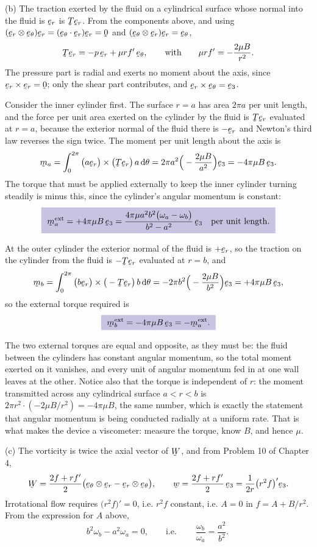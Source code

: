 \begin{solution}
(b) The traction exerted by the fluid on a cylindrical surface
whose normal into the fluid is $\ber$ is $\bT\ber$. From the components
above, and using $(\ber\otimes\bet)\ber=(\ip{\bet}{\ber})\ber=\bze$ and
$(\bet\otimes\ber)\ber=\bet$,
\[
   \bT\ber=-p\,\ber+\mu rf'\,\bet,
   \qquad\text{with}\qquad
   \mu rf'=-\frac{2\mu B}{r^{2}} .
\]
The pressure part is radial and exerts no moment about the axis, since
$\ber\times\ber=\bze$; only the shear part contributes, and
$\ber\times\bet=\be_{3}$.

Consider the inner cylinder first. The surface $r=a$ has area $2\pi a$
per unit length, and the force per unit area exerted on the cylinder by
the fluid is $\bT\ber$ evaluated at $r=a$, because the exterior normal
of the fluid there is $-\ber$ and Newton's third law reverses the sign
twice. The moment per unit length about the axis is
\[
   \bmm_{a}=\int_{0}^{2\pi}\big(a\ber\big)\times
   \big(\bT\ber\big)\,a\,\dl\theta
   =2\pi a^{2}\Big(-\frac{2\mu B}{a^{2}}\Big)\be_{3}
   =-4\pi\mu B\,\be_{3}.
\]
The torque that must be applied externally to keep the inner cylinder
turning steadily is minus this, since the cylinder's angular momentum is
constant:
\[
   \boxed{\ \bmm^{\text{ext}}_{a}=+4\pi\mu B\,\be_{3}
   =\frac{4\pi\mu a^{2}b^{2}\big(\omega_{a}-\omega_{b}\big)}
          {b^{2}-a^{2}}\,\be_{3}\quad\text{per unit length}. \ }
\]

At the outer cylinder the exterior normal of the fluid is $+\ber$, so
the traction on the cylinder from the fluid is $-\bT\ber$ evaluated at
$r=b$, and
\[
   \bmm_{b}=\int_{0}^{2\pi}\big(b\ber\big)\times
   \big(-\bT\ber\big)\,b\,\dl\theta
   =-2\pi b^{2}\Big(-\frac{2\mu B}{b^{2}}\Big)\be_{3}
   =+4\pi\mu B\,\be_{3},
\]
so the external torque required is
\[
   \boxed{\ \bmm^{\text{ext}}_{b}=-4\pi\mu B\,\be_{3}
   =-\bmm^{\text{ext}}_{a}. \ }
\]

The two external torques are equal and opposite, as they must be: the
fluid between the cylinders has constant angular momentum, so the total
moment exerted on it vanishes, and every unit of angular momentum fed in
at one wall leaves at the other. Notice also that the torque is
independent of $r$: the moment transmitted across any cylindrical
surface $a<r<b$ is $2\pi r^{2}\cdot(-2\mu B/r^{2})=-4\pi\mu B$, the same
number, which is exactly the statement that angular momentum is being
conducted radially at a uniform rate. That is what makes the device a
viscometer: measure the torque, know $B$, and hence $\mu$.

(c) The vorticity is twice the axial vector of $\bW$, and from
Problem 10 of Chapter 4,
\[
   \bW=\frac{2f+rf'}{2}\big(\bet\otimes\ber-\ber\otimes\bet\big),
   \qquad
   \bw=\frac{2f+rf'}{2}\,\be_{3}=\frac{1}{2r}\big(r^{2}f\big)'\be_{3}.
\]
Irrotational flow requires $\big(r^{2}f\big)'=0$, i.e. $r^{2}f$
constant, i.e. $A=0$ in $f=A+B/r^{2}$. From the expression for $A$ above,
\[
   b^{2}\omega_{b}-a^{2}\omega_{a}=0,
   \qquad\text{i.e.}\qquad
   \boxed{\ \frac{\omega_{b}}{\omega_{a}}=\frac{a^{2}}{b^{2}} .\ }
\]


\end{solution}

